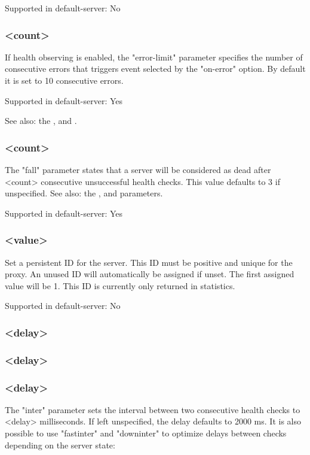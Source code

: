   Supported in default-server: No

\subsubsection[error-limit]{ <count>}
  If health observing is enabled, the "error-limit" parameter specifies the
  number of consecutive errors that triggers event selected by the "on-error"
  option. By default it is set to 10 consecutive errors.

  Supported in default-server: Yes

  See also: the ,  and .

\subsubsection[fall]{ <count>}
  The "fall" parameter states that a server will be considered as dead after
  <count> consecutive unsuccessful health checks. This value defaults to 3 if
  unspecified. See also: the ,  and  parameters.

  Supported in default-server: Yes

\subsubsection[id]{ <value>}
  Set a persistent ID for the server. This ID must be positive and unique for
  the proxy. An unused ID will automatically be assigned if unset. The first
  assigned value will be 1. This ID is currently only returned in statistics.

  Supported in default-server: No

\subsubsection[inter]{ <delay>}
\subsubsection[fastinter]{ <delay>}
\subsubsection[downinter]{ <delay>}
  The "inter" parameter sets the interval between two consecutive health checks
  to <delay> milliseconds. If left unspecified, the delay defaults to 2000 ms.
  It is also possible to use "fastinter" and "downinter" to optimize delays
  between checks depending on the server state:

